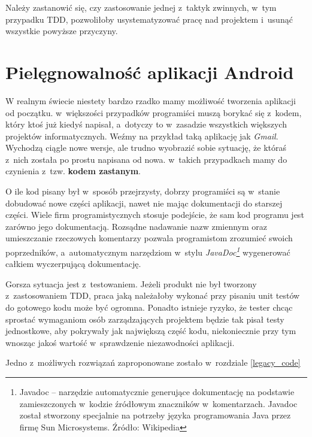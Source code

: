 Należy zastanowić się, czy zastosowanie jednej z~taktyk zwinnych, w~tym przypadku TDD, pozwoliłoby usystematyzować pracę nad projektem i~usunąć wszystkie powyższe przyczyny.

\section{Pielęgnowalność aplikacji Android}
\label{pielegnowalnosc_aplikacji}
W realnym świecie niestety bardzo rzadko mamy możliwość tworzenia aplikacji od początku. w~większości przypadków programiści muszą borykać się z~kodem, który ktoś już kiedyś napisał, a~dotyczy to w~zasadzie wszystkich większych projektów informatycznych. Weźmy na przykład taką aplikację jak \textit{Gmail}. Wychodzą ciągle nowe wersje, ale trudno wyobrazić sobie sytuację, że któraś z~nich została po prostu napisana od nowa. w~takich przypadkach mamy do czynienia z~tzw. \textbf{kodem zastanym}.

O ile kod pisany był w~sposób przejrzysty, dobrzy programiści są w~stanie dobudować nowe części aplikacji, nawet nie mając dokumentacji do starszej części. Wiele firm programistycznych stosuje podejście, że sam kod programu jest zarówno jego dokumentacją. Rozsądne nadawanie nazw zmiennym oraz umieszczanie rzeczowych komentarzy pozwala programistom zrozumieć swoich poprzedników, a~automatycznym narzędziom w~stylu \textit{JavaDoc\footnote{Javadoc – narzędzie automatycznie generujące dokumentację na podstawie zamieszczonych w~kodzie źródłowym znaczników w~komentarzach. Javadoc został stworzony specjalnie na potrzeby języka programowania Java przez firmę Sun Microsystems. Źródło: Wikipedia}} wygenerować całkiem wyczerpującą dokumentację.

Gorsza sytuacja jest z~testowaniem. Jeżeli produkt nie był tworzony z~zastosowaniem TDD, praca jaką należałoby wykonać przy pisaniu unit testów do gotowego kodu może być ogromna. Ponadto istnieje ryzyko, że tester chcąc sprostać wymaganiom osób zarządzających projektem będzie tak pisał testy jednostkowe, aby pokrywały jak największą część kodu, niekoniecznie przy tym wnosząc jakoś wartość w~sprawdzenie niezawodności aplikacji.

Jedno z~możliwych rozwiązań zaproponowane zostało w~rozdziale \ref{legacy_code}